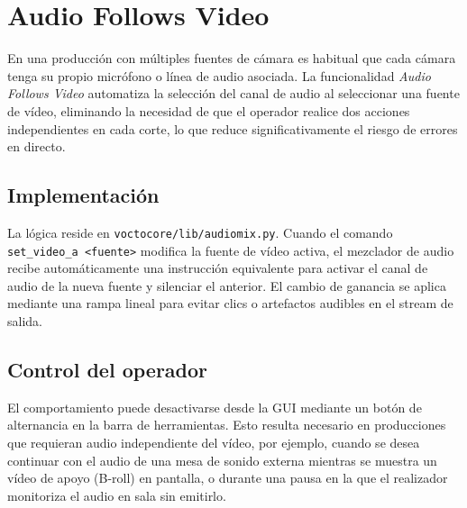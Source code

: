 \section{Audio Follows Video}

En una producción con múltiples fuentes de cámara es habitual que cada cámara tenga
su propio micrófono o línea de audio asociada. La funcionalidad \textit{Audio Follows
Video} automatiza la selección del canal de audio al seleccionar una fuente de vídeo,
eliminando la necesidad de que el operador realice dos acciones independientes en cada
corte, lo que reduce significativamente el riesgo de errores en directo.

\subsection{Implementación}

La lógica reside en \texttt{voctocore/lib/audiomix.py}. Cuando el comando
\texttt{set\_video\_a <fuente>} modifica la fuente de vídeo activa, el mezclador de
audio recibe automáticamente una instrucción equivalente para activar el canal de audio
de la nueva fuente y silenciar el anterior. El cambio de ganancia se aplica mediante
una rampa lineal para evitar clics o artefactos audibles en el stream de salida.

\subsection{Control del operador}

El comportamiento puede desactivarse desde la GUI mediante un botón de alternancia en
la barra de herramientas. Esto resulta necesario en producciones que requieran audio
independiente del vídeo, por ejemplo, cuando se desea continuar con el audio de una
mesa de sonido externa mientras se muestra un vídeo de apoyo (B-roll) en pantalla, o
durante una pausa en la que el realizador monitoriza el audio en sala sin emitirlo.
